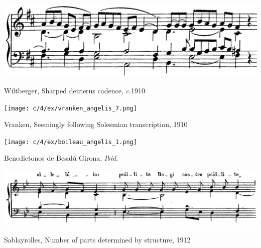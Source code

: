 \vspace*{\fill}

\begin{example}
  \centering
  \includegraphics[width=\linewidth]{c/4/ex/wiltberger_deuterus_60.png}
  \caption{Wiltberger, Sharped deuterus cadence, \emph{c}.1910}
  \label{mus:wiltberger_deuterus_60}
\end{example}

\vspace*{\fill}

\begin{landscape}

  \vspace*{\fill}

  \begin{example}
    \centering
    \texttt{[image: c/4/ex/vranken\_angelis\_7.png]}
    \caption{Vranken, Seemingly following Solesmian transcription, 1910}
    \label{mus:vranken_angelis_7}
  \end{example}

  \vspace*{\fill}

\end{landscape}

\begin{landscape}

  \vspace*{\fill}

  \begin{example}
    \centering
    \texttt{[image: c/4/ex/boileau\_angelis\_1.png]}
    \caption{Benedictonos de Besalú Girona, \emph{Ibid}.}
    \label{mus:boileau_angelis_15}
  \end{example}

  \vspace*{\fill}

\end{landscape}

\vspace*{\fill}

\begin{example}
  \centering
  \includegraphics[width=\linewidth]{c/4/ex/sablayrolles_parts.png}
  \caption{Sablayrolles, Number of parts determined by structure, 1912}
  \label{mus:sablayrolles_parts}
\end{example}

